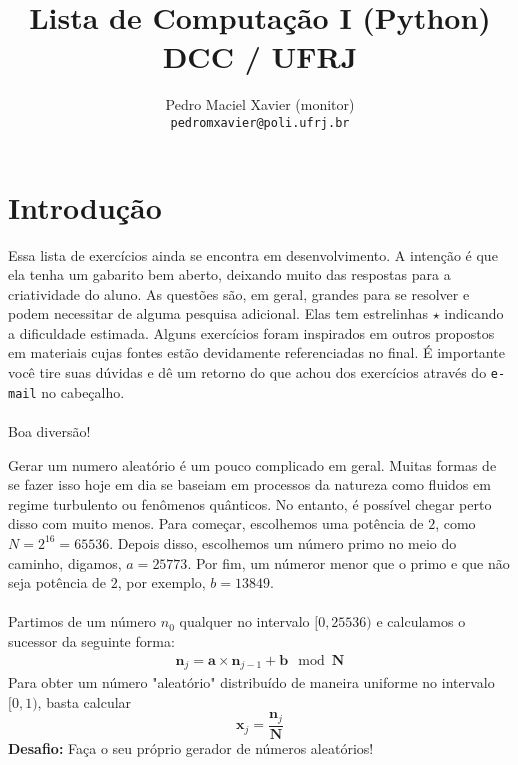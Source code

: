 \documentclass[12pt]{article}
\title{Lista de Computação I (Python) \\ {\normalsize DCC / UFRJ}}
\author{Pedro Maciel Xavier (monitor)\\ \texttt{pedromxavier@poli.ufrj.br}}
\begin{document}
	\maketitle
	\section*{Introdução}
	Essa lista de exercícios ainda se encontra em desenvolvimento. A intenção é que ela tenha um gabarito bem aberto, deixando muito das respostas para a criatividade do aluno. As questões são, em geral, grandes para se resolver e podem necessitar de alguma pesquisa adicional. Elas tem estrelinhas $\star$ indicando a dificuldade estimada. Alguns exercícios foram inspirados em outros propostos em materiais cujas fontes estão devidamente referenciadas no final. É importante você tire suas dúvidas e dê um retorno do que achou dos exercícios através do \texttt{e-mail} no cabeçalho.
	~\\
	~\\
	Boa diversão! \par
	\pagebreak
	
	
	\tableofcontents
	
	
	
	
	Gerar um numero aleatório é um pouco complicado em geral. Muitas formas de se fazer isso hoje em dia se baseiam em processos da natureza como fluidos em regime turbulento ou fenômenos quânticos. No entanto, é possível chegar perto disso com muito menos. Para começar, escolhemos uma potência de $2$, como $N = 2^{16} = 65536$. Depois disso, escolhemos um número primo no meio do caminho, digamos, $a = 25773$. Por fim, um númeror menor que o primo e que não seja potência de $2$, por exemplo, $b = 13849$.\\
	\\
	Partimos de um número $n_0$ qualquer no intervalo $[0, 25536)$ e calculamos o sucessor da seguinte forma:
	\begin{align*}
		\mathbf{n}_j = \mathbf{a} \times \mathbf{n}_{j-1} + \mathbf{b} \mod \mathbf{N}
	\end{align*}
	Para obter um número "aleatório" distribuído de maneira uniforme no intervalo $[0, 1)$, basta calcular
		$$\mathbf{x}_j = \frac{\mathbf{n}_j}{\mathbf{N}}$$
	\textbf{Desafio:} Faça o seu próprio gerador de números aleatórios!
	
\end{document}
